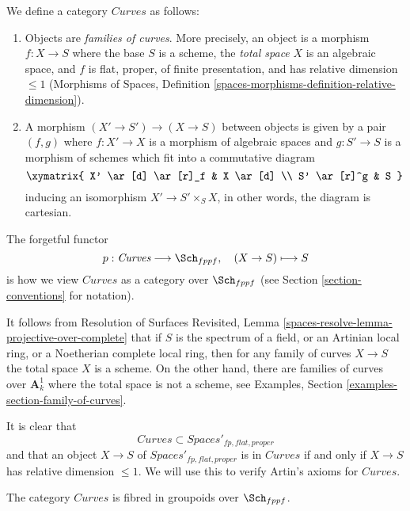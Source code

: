 \begin{situation}
\label{situation-curves}
We define a category $\textit{Curves}$ as follows:
\begin{enumerate}
\item Objects are {\it families of curves}. More precisely, an
object is a morphism $f : X \to S$ where the base $S$ is a scheme,
the {\it total space} $X$ is an algebraic space, and
$f$ is flat, proper, of finite presentation,
and has relative dimension $\leq 1$ (Morphisms of Spaces, Definition
\ref{spaces-morphisms-definition-relative-dimension}).
\item A morphism $(X' \to S') \to (X \to S)$ between objects
is given by a pair $(f, g)$ where $f : X' \to X$ is a morphism
of algebraic spaces and $g : S' \to S$ is a morphism of schemes
which fit into a commutative diagram
$$
\xymatrix{
X' \ar[d] \ar[r]_f & X \ar[d] \\
S' \ar[r]^g & S
}
$$
inducing an isomorphism $X' \to S' \times_S X$, in other words, the
diagram is cartesian.
\end{enumerate}
The forgetful functor
$$
p : \textit{Curves} \longrightarrow \Sch_{fppf},\quad
(X \to S) \longmapsto S
$$
is how we view $\textit{Curves}$ as a category over $\Sch_{fppf}$
(see Section \ref{section-conventions} for notation).
\end{situation}

\noindent
It follows from Resolution of Surfaces Revisited, Lemma
\ref{spaces-resolve-lemma-projective-over-complete}
that if $S$ is the spectrum of a field, or an Artinian local ring,
or a Noetherian complete local ring, then for any family of curves
$X \to S$ the total space $X$ is a scheme.
On the other hand, there are families of curves
over $\mathbf{A}^1_k$ where the total space is not a scheme, see
Examples, Section \ref{examples-section-family-of-curves}.

\medskip\noindent
It is clear that
\begin{equation}
\label{equation-curves-over-proper-spaces}
\textit{Curves} \subset \textit{Spaces}'_{fp, flat, proper}
\end{equation}
and that an object $X \to S$ of $\textit{Spaces}'_{fp, flat, proper}$
is in $\textit{Curves}$ if and only if $X \to S$ has relative
dimension $\leq 1$. We will use this to verify Artin's axioms
for $\textit{Curves}$.

\begin{lemma}
\label{lemma-curves-fibred-in-groupoids}
The category $\textit{Curves}$ is fibred in groupoids over $\Sch_{fppf}$.
\end{lemma}


